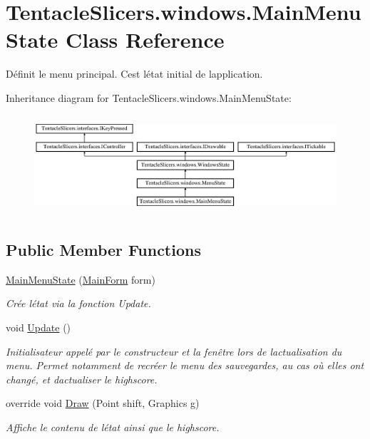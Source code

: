 \hypertarget{class_tentacle_slicers_1_1windows_1_1_main_menu_state}{}\section{Tentacle\+Slicers.\+windows.\+Main\+Menu\+State Class Reference}
\label{class_tentacle_slicers_1_1windows_1_1_main_menu_state}


Définit le menu principal. C\textquotesingle{}est l\textquotesingle{}état initial de l\textquotesingle{}application.  


Inheritance diagram for Tentacle\+Slicers.\+windows.\+Main\+Menu\+State\+:\begin{figure}[H]
\begin{center}
\leavevmode
\includegraphics[height=3.718459cm]{class_tentacle_slicers_1_1windows_1_1_main_menu_state}
\end{center}
\end{figure}
\subsection*{Public Member Functions}
\begin{DoxyCompactItemize}
\item 
\hyperlink{class_tentacle_slicers_1_1windows_1_1_main_menu_state_a168d861f7bcf27f11cd0726cda70ea5b}{Main\+Menu\+State} (\hyperlink{class_tentacle_slicers_1_1windows_1_1_main_form}{Main\+Form} form)
\begin{DoxyCompactList}\small\item\em Crée l\textquotesingle{}état via la fonction Update. \end{DoxyCompactList}\item 
void \hyperlink{class_tentacle_slicers_1_1windows_1_1_main_menu_state_af3cbcae8c1fb4060c3241fe1d09f055a}{Update} ()
\begin{DoxyCompactList}\small\item\em Initialisateur appelé par le constructeur et la fenêtre lors de l\textquotesingle{}actualisation du menu. Permet notamment de recréer le menu des sauvegardes, au cas où elles ont changé, et d\textquotesingle{}actualiser le highscore. \end{DoxyCompactList}\item 
override void \hyperlink{class_tentacle_slicers_1_1windows_1_1_main_menu_state_a2f9917d79a2294298698a70cd8932226}{Draw} (Point shift, Graphics g)
\begin{DoxyCompactList}\small\item\em Affiche le contenu de l\textquotesingle{}état ainsi que le highscore. \end{DoxyCompactList}\end{DoxyCompactItemize}
